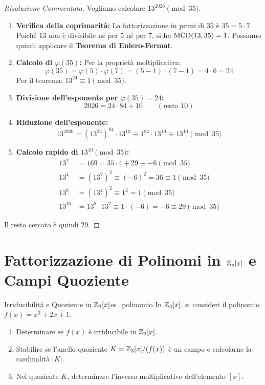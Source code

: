 \begin{proof}[Risoluzione Commentata]
Vogliamo calcolare $13^{2026} \pmod{35}$.
\begin{enumerate}
    \item \textbf{Verifica della coprimarità:} La fattorizzazione in primi di $35$ è $35 = 5 \cdot 7$.
    Poiché $13$ non è divisibile né per $5$ né per $7$, si ha $\operatorname{MCD}(13, 35) = 1$.
    Possiamo quindi applicare il \textbf{Teorema di Eulero-Fermat}.
    \item \textbf{Calcolo di $\varphi(35)$:} Per la proprietà moltiplicativa:
    \[
        \varphi(35) = \varphi(5) \cdot \varphi(7) = (5 - 1) \cdot (7 - 1) = 4 \cdot 6 = 24
    \]
    Per il teorema: $13^{24} \equiv 1 \pmod{35}$.
    \item \textbf{Divisione dell'esponente per $\varphi(35) = 24$:}
    \[
        2026 = 24 \cdot 84 + 10 \qquad (\text{resto } 10)
    \]
    \item \textbf{Riduzione dell'esponente:}
    \[
        13^{2026} = (13^{24})^{84} \cdot 13^{10} \equiv 1^{84} \cdot 13^{10} \equiv 13^{10} \pmod{35}
    \]
    \item \textbf{Calcolo rapido di $13^{10} \pmod{35}$:}
    \begin{align*}
        13^2 &= 169 = 35 \cdot 4 + 29 \equiv -6 \pmod{35} \\
        13^4 &= (13^2)^2 \equiv (-6)^2 = 36 \equiv 1 \pmod{35} \\
        13^8 &= (13^4)^2 \equiv 1^2 = 1 \pmod{35} \\
        13^{10} &= 13^8 \cdot 13^2 \equiv 1 \cdot (-6) = -6 \equiv 29 \pmod{35}
    \end{align*}
\end{enumerate}
Il resto cercato è quindi $29$.
\end{proof}

\section{Fattorizzazione di Polinomi in $\mathbb{Z}_p[x]$ e Campi Quoziente}

\begin{esercizio}{Irriducibilità e Quoziente in $\mathbb{Z}_3[x]$}{es_polinomio}
In $\mathbb{Z}_3[x]$, si consideri il polinomio $f(x) = x^3 + 2x + 1$.
\begin{enumerate}
    \item Determinare se $f(x)$ è irriducibile in $\mathbb{Z}_3[x]$.
    \item Stabilire se l'anello quoziente $K = \mathbb{Z}_3[x]/(f(x))$ è un campo e calcolarne la cardinalità $|K|$.
    \item Nel quoziente $K$, determinare l'inverso moltiplicativo dell'elemento $[x]$.
\end{enumerate}
\end{esercizio}

